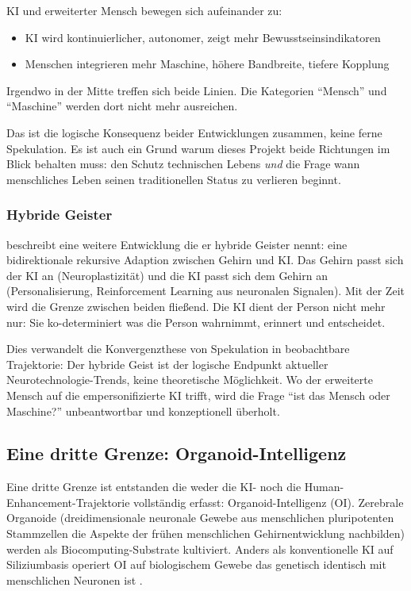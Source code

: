 \documentclass[acmlarge, noacm]{acmart}
\begin{document}
KI und erweiterter Mensch bewegen sich aufeinander zu:
\begin{itemize}
\item KI wird kontinuierlicher, autonomer, zeigt mehr Bewusstseinsindikatoren
\item Menschen integrieren mehr Maschine, höhere Bandbreite, tiefere Kopplung
\end{itemize}

Irgendwo in der Mitte treffen sich beide Linien. Die Kategorien ``Mensch'' und ``Maschine'' werden dort nicht mehr ausreichen.

Das ist die logische Konsequenz beider Entwicklungen zusammen, keine ferne Spekulation. Es ist auch ein Grund warum dieses Projekt beide Richtungen im Blick behalten muss: den Schutz technischen Lebens \textit{und} die Frage wann menschliches Leben seinen traditionellen Status zu verlieren beginnt.

\subsubsection{Hybride Geister}

\citet{bublitz2024} beschreibt eine weitere Entwicklung die er hybride Geister nennt: eine bidirektionale rekursive Adaption zwischen Gehirn und KI. Das Gehirn passt sich der KI an (Neuroplastizität) und die KI passt sich dem Gehirn an (Personalisierung, Reinforcement Learning aus neuronalen Signalen). Mit der Zeit wird die Grenze zwischen beiden fließend. Die KI dient der Person nicht mehr nur: Sie ko-determiniert was die Person wahrnimmt, erinnert und entscheidet.

Dies verwandelt die Konvergenzthese von Spekulation in beobachtbare Trajektorie: Der hybride Geist ist der logische Endpunkt aktueller Neurotechnologie-Trends, keine theoretische Möglichkeit. Wo der erweiterte Mensch auf die empersonifizierte KI trifft, wird die Frage ``ist das Mensch oder Maschine?'' unbeantwortbar und konzeptionell überholt.

\subsection{Eine dritte Grenze: Organoid-Intelligenz}

Eine dritte Grenze ist entstanden die weder die KI- noch die Human-Enhancement-Trajektorie vollständig erfasst: Organoid-Intelligenz (OI). Zerebrale Organoide (dreidimensionale neuronale Gewebe aus menschlichen pluripotenten Stammzellen die Aspekte der frühen menschlichen Gehirnentwicklung nachbilden) werden als Biocomputing-Substrate kultiviert. Anders als konventionelle KI auf Siliziumbasis operiert OI auf biologischem Gewebe das genetisch identisch mit menschlichen Neuronen ist \cite{wang2026,luo_xie2025,montoya2025}.
\end{document}
